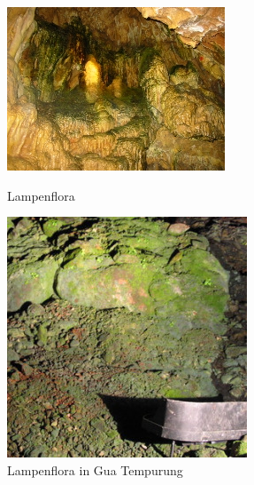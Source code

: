 \documentclass[draft, final]{report}
\begin{document}
\begin{figure}[!ht]
    \begin{minipage}[c]{.46\linewidth}
        \centering
        \includegraphics[scale=1.1]{LateX/Images/lampenflora1.jpg}
        \caption{Lampenflora\cite{lampenflora}}
    \end{minipage}
    \hfill%
    \begin{minipage}[c]{.46\linewidth}
        \centering
        \includegraphics[scale=0.7]{LateX/Images/lampenflora2.jpg}
        \caption{Lampenflora in Gua Tempurung\cite{lampenflora2}}
    \end{minipage}
\end{figure}
\end{document}
